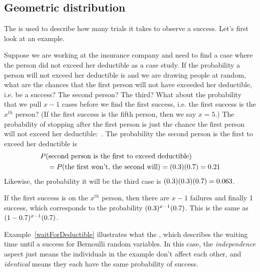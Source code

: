


\subsection{Geometric distribution}


The 
is used to describe how
many trials it takes to observe a success.
Let's first look at an example.

\begin{examplewrap}
\begin{nexample}{Suppose we are working at the insurance
    company and need to find a case where the person did
    not exceed her deductible as a case study.
    If the probability a person will not exceed her
    deductible is \insureSprob{} and we are drawing people
    at random, what are the chances that the first person
    will not have exceeded her deductible, i.e. be a success?
    The second person?
    The third?
    What about the probability that we pull $x - 1$ cases before we find
    the first success, i.e. the first success is the
    $x^{th}$ person?
    (If the first success is the fifth person, then we say $x=5$.)}
  \label{waitForDeductible}%
  The probability of stopping after the first person is just
  the chance the first person will not exceed her deductible:~\insureSprob{}.
The probability the second person is the first to exceed
  her deductible is  \begin{align*}
  &P(\text{second person is the first to exceed deductible})  \\
  &\quad
    = P(\text{the first won't, the second will})
    = (0.3{})(0.7{})
    = 0.21{}
  \end{align*}
  Likewise, the probability it will be the third case is
  $(0.3{})(0.3{})(0.7{})
    = 0.063$.

  If the first success is on the $x^{th}$ person,
  then there are $x-1$ failures and finally 1 success,
  which corresponds to the probability
  $(0.3{})^{x-1}(0.7{})$.
  This is the same as
  $(1-0.7{})^{x-1}(0.7{})$.
\end{nexample}
\end{examplewrap}


Example~\ref{waitForDeductible} illustrates what the
,
which describes the waiting
time until a success for
Bernoulli random variables.
In this case, the \emph{independence} aspect just means
the individuals in the example don't affect each other,
and \emph{identical} means they each have the same probability
of success.

